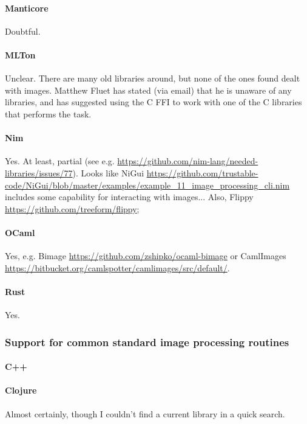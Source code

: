 \paragraph{Manticore}
Doubtful.

\paragraph{MLTon}
Unclear.  There are many old libraries around, but none of the ones found dealt with images.  Matthew Fluet has stated (via email) that he is unaware of any libraries, and has suggested using the C FFI to work with one of the C libraries that performs the task.

\paragraph{Nim}
Yes.  At least, partial (see e.g. \url{https://github.com/nim-lang/needed-libraries/issues/77}).  Looks like NiGui \url{https://github.com/trustable-code/NiGui/blob/master/examples/example_11_image_processing_cli.nim} includes some capability for interacting with images...  Also, Flippy \url{https://github.com/treeform/flippy}; 

\paragraph{OCaml}
Yes, e.g. Bimage \url{https://github.com/zshipko/ocaml-bimage} or CamlImages \url{https://bitbucket.org/camlspotter/camlimages/src/default/}.

\paragraph{Rust}
Yes.

\subsubsection{Support for common standard image processing routines}

\paragraph{C++}

\paragraph{Clojure}
Almost certainly, though I couldn't find a current library in a quick search.

